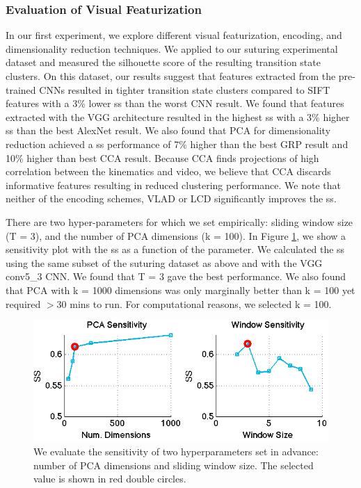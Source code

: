 \subsubsection{Evaluation of Visual Featurization}
In our first experiment, we explore different visual featurization, encoding, and dimensionality reduction techniques.
We applied \tsc to our suturing experimental dataset and measured the silhouette score of the resulting transition state clusters.
On this dataset, our results suggest that features extracted from the pre-trained CNNs resulted in tighter transition state clusters compared to SIFT features with a 3\% lower \textsf{ss} than the worst CNN result.
We found that features extracted with the VGG architecture resulted in the highest \textsf{ss} with a 3\% higher \textsf{ss} than the best AlexNet result.
We also found that PCA for dimensionality reduction achieved a \textsf{ss} performance of 7\% higher than the best GRP result and 10\% higher than best CCA result.
Because CCA finds projections of high correlation between the kinematics and video, we believe that CCA discards informative features resulting in reduced clustering performance. 
We note that neither of the encoding schemes, VLAD or LCD significantly improves the \textsf{ss}.

There are two hyper-parameters for \tsc which we set empirically: sliding window size (T = 3), and the number of PCA dimensions (k = 100).
In Figure \ref{fig:sensitvity}, we show a sensitivity plot with the \textsf{ss} as a function of the parameter.
We calculated the \textsf{ss} using the same subset of the suturing dataset as above and with the VGG conv5\_3 CNN.
We found that T = 3 gave the best performance.
We also found that PCA with k = 1000 dimensions was only marginally better than k = 100 yet required $>$30 mins to run.
For computational reasons, we selected k = 100.


\begin{figure}[ht!]
\centering
    \includegraphics[width=0.95\linewidth]{tsc-experiments/sensitivity}
    \caption{We evaluate the sensitivity of two hyperparameters set in advance: number of PCA dimensions and sliding window size. The selected value is shown in red double circles.\label{fig:sensitvity}}
\end{figure}


